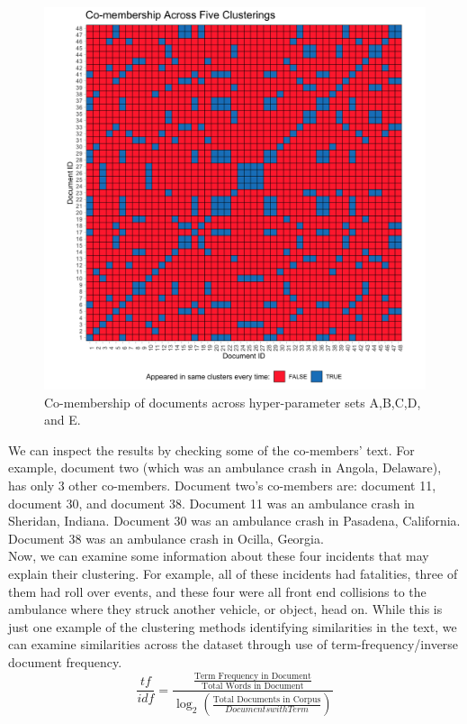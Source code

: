 \begin{figure}
\includegraphics[width=6in]{Content/Images/comembers5.png}
\caption{Co-membership of documents across hyper-parameter sets A,B,C,D, and E.}
\end{figure}

We can inspect the results by checking some of the co-members' text. For example, document two (which was an ambulance crash in Angola, Delaware), has only 3 other co-members. Document two's co-members are: document 11, document 30, and document 38. Document 11 was an ambulance crash in Sheridan, Indiana. Document 30 was an ambulance crash in Pasadena, California. Document 38 was an ambulance crash in Ocilla, Georgia.\\

Now, we can examine some information about these four incidents that may explain their clustering. For example, all of these incidents had fatalities, three of them had roll over events, and these four were all front end collisions to the ambulance where they struck another vehicle, or object, head on. While this is just one example of the clustering methods identifying similarities in the text, we can examine similarities across the dataset through use of term-frequency/inverse document frequency.\\

\begin{equation}
\frac{tf}{idf} = \frac{\frac{\text{Term Frequency in Document}}{\text{Total Words in Document}}}{\log_2(\frac{\text{Total Documents in Corpus}}{Documents with Term})}
\end{equation}

